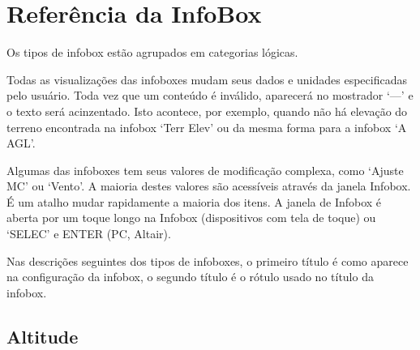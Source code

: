 \chapter{Referência da InfoBox}\label{cha:infobox}
Os tipos de infobox estão agrupados em categorias lógicas.

Todas as visualizações das infoboxes mudam seus dados e unidades especificadas pelo usuário.  Toda vez que um conteúdo é inválido, aparecerá no mostrador ‘—’ e o texto será acinzentado.  Isto acontece, por exemplo, quando não há elevação do terreno encontrada na infobox ‘Terr Elev’ ou da mesma forma para a infobox ‘A AGL’.

Algumas das infoboxes tem seus valores de modificação complexa, como ‘Ajuste MC’ ou ‘Vento’.  A maioria destes valores são acessíveis através da janela Infobox.  É um atalho mudar rapidamente a maioria dos itens.  A janela de Infobox é aberta por um toque longo na Infobox (dispositivos com tela de toque) ou ‘SELEC’ e ENTER (PC, Altair).

Nas descrições seguintes dos tipos de infoboxes, o primeiro título é como aparece na configuração da infobox, o segundo título é o rótulo usado no título da infobox.


\newcommand{\ibi}[3]{%
\jindent{
\begin{tabular}{r}
{\bf #1} \\
\infobox{{#2}} \\
\end{tabular}}{#3}
}
\newcommand{\ibig}[4]{%
\jindent{
\begin{tabular}{r}
{\bf #1} \\
\infobox{{#2}} \\
\texttt{[image: \#4]} \\
\end{tabular}}{#3}
}


\section{Altitude}

